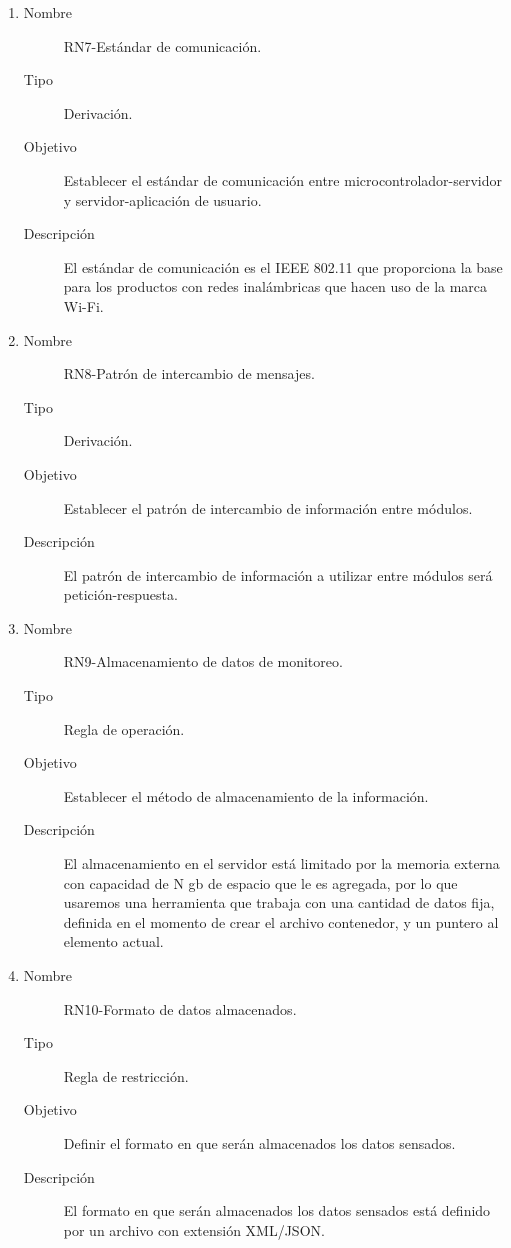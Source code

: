 \begin{enumerate}[label=RN\arabic*.]
\item \label{RN7}
		\begin{description}
			\item[Nombre] RN7-Estándar de comunicación.
			\item[Tipo] Derivación.
			\item[Objetivo] Establecer el estándar de comunicación entre microcontrolador-servidor y servidor-aplicación de usuario.
			\item[Descripción] El estándar de comunicación es el IEEE 802.11 que proporciona la base para los productos con redes inalámbricas que hacen uso de la marca Wi-Fi.
		\end{description}
		
\item \label{RN8}
		\begin{description}
			\item[Nombre] RN8-Patrón de intercambio de mensajes.
			\item[Tipo] Derivación.
			\item[Objetivo] Establecer el patrón de intercambio de información entre módulos.
			\item[Descripción] El patrón de intercambio de información a utilizar entre módulos será petición-respuesta.
		\end{description}
		
\item \label{RN9}
		\begin{description}
			\item[Nombre] RN9-Almacenamiento de datos de monitoreo.
			\item[Tipo] Regla de operación.
			\item[Objetivo] Establecer el método de almacenamiento de la información.
			\item[Descripción] El almacenamiento en el servidor está limitado por la memoria externa con capacidad de N gb de espacio que le es agregada, por lo que usaremos una herramienta que trabaja con una cantidad de datos fija, definida en el momento de crear el archivo contenedor, y un puntero al elemento actual.
		\end{description}


\item \label{RN10}
		\begin{description}
			\item[Nombre] RN10-Formato de datos almacenados.
			\item[Tipo] Regla de restricción.
			\item[Objetivo] Definir el formato en que serán almacenados los datos sensados.
			\item[Descripción] El formato en que serán almacenados los datos sensados está definido por un archivo con extensión XML/JSON. 
		\end{description}


\end{enumerate}
